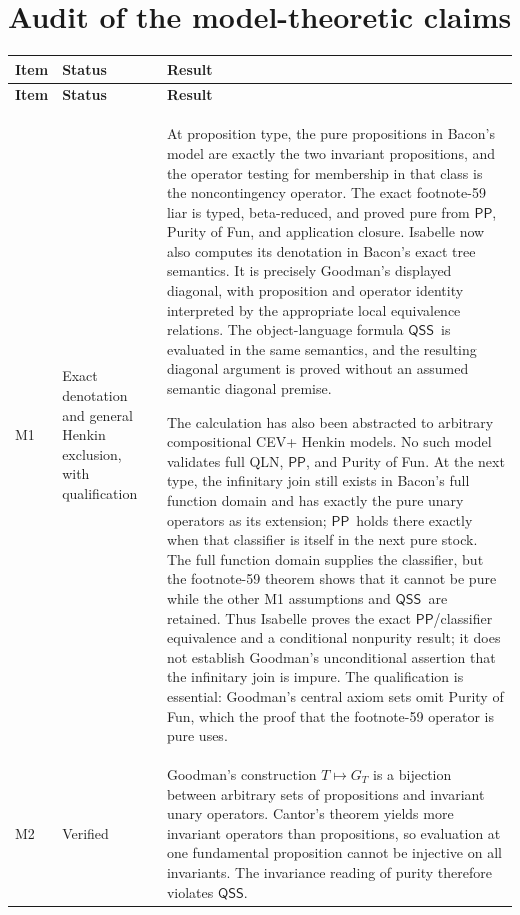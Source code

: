 \documentclass[12pt,leqno]{article}
\theoremstyle{plain}
\theoremstyle{definition}
\newcommand{\PP}{\ensuremath{\mathsf{PP}}}
\newcommand{\QSS}{\ensuremath{\mathsf{QSS}}}
\begin{document}
\section{Audit of the model-theoretic claims}

\begin{longtable}{>{\raggedright\arraybackslash}p{0.55in}
                  >{\raggedright\arraybackslash}p{1.28in}
                  >{\raggedright\arraybackslash}p{4.25in}}
\toprule
\textbf{Item} & \textbf{Status} & \textbf{Result}\\
\midrule
\endfirsthead
\toprule
\textbf{Item} & \textbf{Status} & \textbf{Result}\\
\midrule
\endhead
M1 & Exact denotation and general Henkin exclusion, with qualification &
At proposition type, the pure propositions in Bacon's model are exactly the two
invariant propositions, and the operator testing for membership in that class
is the noncontingency operator.  The exact footnote-59 liar is typed,
beta-reduced, and proved pure from \PP, Purity of Fun, and application
closure.  Isabelle now also computes its denotation in Bacon's exact tree
semantics.  It is precisely Goodman's displayed diagonal, with proposition
and operator identity interpreted by the appropriate local equivalence
relations.  The object-language formula \QSS\ is evaluated in the same
semantics, and the resulting diagonal argument is proved without an assumed
semantic diagonal premise.

The calculation has also been abstracted to arbitrary compositional CEV+
Henkin models.  No such model validates full QLN, \PP, and Purity of Fun.
At the next type, the infinitary join still exists in Bacon's full function
domain and has exactly the pure unary operators as its extension; \PP\ holds
there exactly when that classifier is itself in the next pure stock.
The full function domain supplies the classifier, but the footnote-59 theorem
shows that
it cannot be pure while the other M1 assumptions and \QSS\ are retained.
Thus Isabelle proves the exact \PP/classifier equivalence and a conditional
nonpurity result; it does not establish Goodman's unconditional assertion
that the infinitary join is impure.
The qualification is essential: Goodman's central axiom sets omit Purity of
Fun, which the proof that the footnote-59 operator is pure uses.\\

M2 & Verified &
Goodman's construction \(T\mapsto G_T\) is a bijection between arbitrary sets
of propositions and invariant unary operators.  Cantor's theorem yields more
invariant operators than propositions, so evaluation at one fundamental
proposition cannot be injective on all invariants.  The invariance reading
of purity therefore violates \QSS.\\


\end{longtable}
\end{document}
